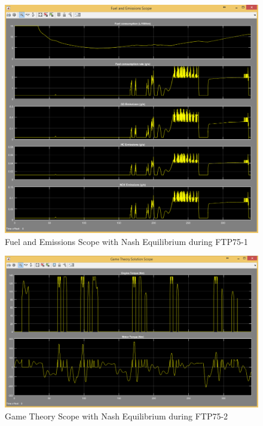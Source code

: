 \begin{figure}[h]
\centering
\includegraphics[scale=0.4]{figures/NashEquilibrium/FTP75-1/fuelEmissions13Juni}
\caption{Fuel and Emissions Scope with Nash Equilibrium during FTP75-1}
\label{fig:fene1}
\end{figure}



\begin{figure}[h]
\centering
\includegraphics[scale=0.4]{figures/NashEquilibrium/FTP75-2/gameTheory13Juni}
\caption{Game Theory Scope with Nash Equilibrium during FTP75-2}
\label{fig:gtne2}
\end{figure}

